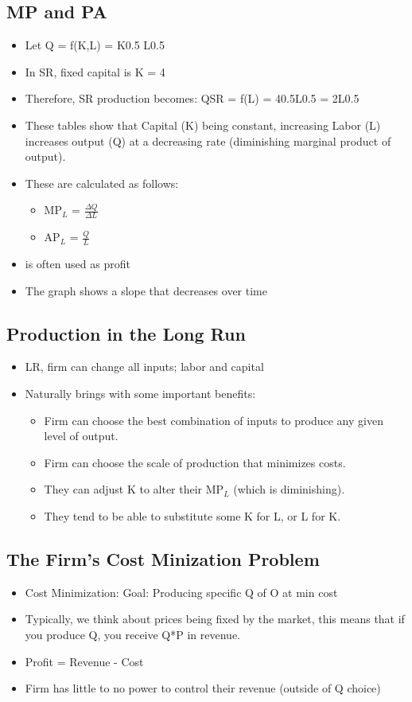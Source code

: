 \documentclass{article}
\begin{document}
\subsection{MP and PA}
\begin{itemize}
  \item Let Q = f(K,L) = K0.5 L0.5
  \item In SR, fixed capital is K = 4
  \item Therefore, SR production becomes:
    QSR = f(L) = 40.5L0.5 = 2L0.5
  \item These tables show that Capital (K) being constant,
    increasing Labor (L) increases output (Q) at a decreasing rate (diminishing marginal product of output).
  \item These are calculated as follows:
    \begin{itemize}
      \item MP$_L$ = $\frac{\Delta Q}{\Delta L}$
      \item AP$_L$ = $\frac{Q}{L}$
    \end{itemize}
  \item \pi{} is often used as profit
  \item The graph shows a slope that decreases over time
\end{itemize}

\subsection{Production in the Long Run}
\begin{itemize}
  \item LR, firm can change all inputs; labor and capital
  \item Naturally brings with some important benefits:
    \begin{itemize}
      \item Firm can choose the best combination of inputs to produce any
        given level of output.
      \item Firm can choose the scale of production that minimizes costs.
      \item They can adjust K to alter their MP$_L$ (which is diminishing).
      \item They tend to be able to substitute some K for L, or L for K.
    \end{itemize}
\end{itemize}

\subsection{The Firm's Cost Minization Problem}
\begin{itemize}
  \item Cost Minimization: Goal: Producing specific Q of O at min cost
  \item Typically, we think about prices being fixed by the market,
    this means that if you produce Q, you receive Q*P in revenue.
  \item Profit = Revenue - Cost
  \item Firm has little to no power to control their revenue (outside of Q choice)
\end{itemize}
\end{document}
